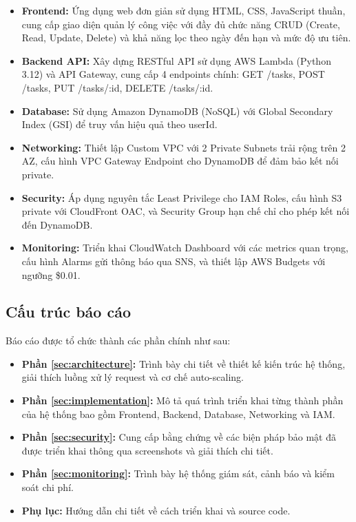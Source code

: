 \begin{itemize}
    \item \textbf{Frontend:} Ứng dụng web đơn giản sử dụng HTML, CSS, JavaScript thuần, cung cấp giao diện quản lý công việc với đầy đủ chức năng CRUD (Create, Read, Update, Delete) và khả năng lọc theo ngày đến hạn và mức độ ưu tiên.
    
    \item \textbf{Backend API:} Xây dựng RESTful API sử dụng AWS Lambda (Python 3.12) và API Gateway, cung cấp 4 endpoints chính: GET /tasks, POST /tasks, PUT /tasks/:id, DELETE /tasks/:id.
    
    \item \textbf{Database:} Sử dụng Amazon DynamoDB (NoSQL) với Global Secondary Index (GSI) để truy vấn hiệu quả theo userId.
    
    \item \textbf{Networking:} Thiết lập Custom VPC với 2 Private Subnets trải rộng trên 2 AZ, cấu hình VPC Gateway Endpoint cho DynamoDB để đảm bảo kết nối private.
    
    \item \textbf{Security:} Áp dụng nguyên tắc Least Privilege cho IAM Roles, cấu hình S3 private với CloudFront OAC, và Security Group hạn chế chỉ cho phép kết nối đến DynamoDB.
    
    \item \textbf{Monitoring:} Triển khai CloudWatch Dashboard với các metrics quan trọng, cấu hình Alarms gửi thông báo qua SNS, và thiết lập AWS Budgets với ngưỡng \$0.01.
\end{itemize}

\subsection{Cấu trúc báo cáo}
\label{ssec:structure}

Báo cáo được tổ chức thành các phần chính như sau:

\begin{itemize}
    \item \textbf{Phần \ref{sec:architecture}:} Trình bày chi tiết về thiết kế kiến trúc hệ thống, giải thích luồng xử lý request và cơ chế auto-scaling.
    
    \item \textbf{Phần \ref{sec:implementation}:} Mô tả quá trình triển khai từng thành phần của hệ thống bao gồm Frontend, Backend, Database, Networking và IAM.
    
    \item \textbf{Phần \ref{sec:security}:} Cung cấp bằng chứng về các biện pháp bảo mật đã được triển khai thông qua screenshots và giải thích chi tiết.
    
    \item \textbf{Phần \ref{sec:monitoring}:} Trình bày hệ thống giám sát, cảnh báo và kiểm soát chi phí.
    
    \item \textbf{Phụ lục:} Hướng dẫn chi tiết về cách triển khai và source code.
\end{itemize}
